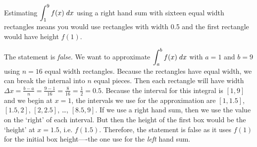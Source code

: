 \documentclass[11pt,letterpaper]{article}
\begin{document}
 Estimating $\displaystyle\int_1^9 f(x) \;dx$ using a right hand sum with sixteen equal width rectangles means you would use rectangles with width 0.5 and the first rectangle would have height $f(1)$. \pspace

\sol The statement is \textit{false}. We want to approximate $\displaystyle\int_a^b f(x) \;dx$ with $a= 1$ and $b= 9$ using $n= 16$ equal width rectangles. Because the rectangles have equal width, we can break the internal into $n$ equal pieces. Then each rectangle will have width $\Delta x= \frac{b - a}{n}= \frac{9 - 1}{16}= \frac{8}{16}= \frac{1}{2}= 0.5$. Because the interval for this integral is $[1, 9]$ and we begin at $x= 1$, the intervals we use for the approximation are $[1, 1.5]$, $[1.5, 2]$, $[2, 2.5]$, \dots, $[8.5, 9]$. If we use a right hand sum, then we use the value on the `right' of each interval. But then the height of the first box would be the `height' at $x= 1.5$, i.e. $f(1.5)$. Therefore, the statement is false as it uses $f(1)$ for the initial box height----the one use for the \textit{left} hand sum. \pvspace{1.3cm}
\end{document}
